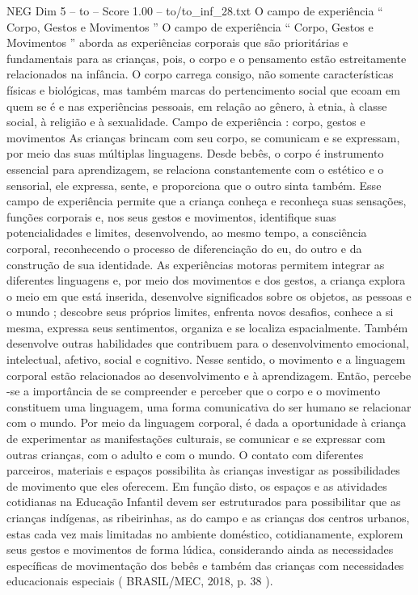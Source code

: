 \begin{textsample}{NEG Dim 5 – to – Score 1.00 – to/to\_inf\_28.txt}  \label{ex:f5_neg_267}
O campo de experiência “ Corpo, Gestos e Movimentos ” O campo de experiência “ Corpo, Gestos e Movimentos ” aborda as experiências corporais que são prioritárias e fundamentais para as crianças, pois, o corpo e o pensamento estão estreitamente relacionados na infância.
O corpo carrega consigo, não somente características físicas e biológicas, mas também marcas do pertencimento social que ecoam em quem se é e nas experiências pessoais, em relação ao gênero, à etnia, à classe social, à religião e à sexualidade.
Campo de experiência : corpo, gestos e movimentos As crianças brincam com seu corpo, se comunicam e se expressam, por meio das suas múltiplas linguagens.
Desde bebês, o corpo é instrumento essencial para aprendizagem, se relaciona constantemente com o estético e o sensorial, ele expressa, sente, e proporciona que o outro sinta também.
Esse campo de experiência permite que a criança conheça e reconheça suas sensações, funções corporais e, nos seus gestos e movimentos, identifique suas potencialidades e limites, desenvolvendo, ao mesmo tempo, a consciência corporal, reconhecendo o processo de diferenciação do eu, do outro e da construção de sua identidade.
As experiências motoras permitem integrar as diferentes linguagens e, por meio dos movimentos e dos gestos, a criança explora o meio em que está inserida, desenvolve significados sobre os objetos, as pessoas e o mundo ; descobre seus próprios limites, enfrenta novos desafios, conhece a si mesma, expressa seus sentimentos, organiza e se localiza espacialmente.
Também desenvolve outras habilidades que contribuem para o desenvolvimento emocional, intelectual, afetivo, social e cognitivo.
Nesse sentido, o movimento e a linguagem corporal estão relacionados ao desenvolvimento e à aprendizagem.
Então, percebe -se a importância de se compreender e perceber que o corpo e o movimento constituem uma linguagem, uma forma comunicativa do ser humano se relacionar com o mundo.
Por meio da linguagem corporal, é dada a oportunidade à criança de experimentar as manifestações culturais, se comunicar e se expressar com outras crianças, com o adulto e com o mundo.
O contato com diferentes parceiros, materiais e espaços possibilita às crianças investigar as possibilidades de movimento que eles oferecem.
Em função disto, os espaços e as atividades cotidianas na Educação Infantil devem ser estruturados para possibilitar que as crianças indígenas, as ribeirinhas, as do campo e as crianças dos centros urbanos, estas cada vez mais limitadas no ambiente doméstico, cotidianamente, explorem seus gestos e movimentos de forma lúdica, considerando ainda as necessidades específicas de movimentação dos bebês e também das crianças com necessidades educacionais especiais ( BRASIL/MEC, 2018, p. 38 ).

\end{textsample}
